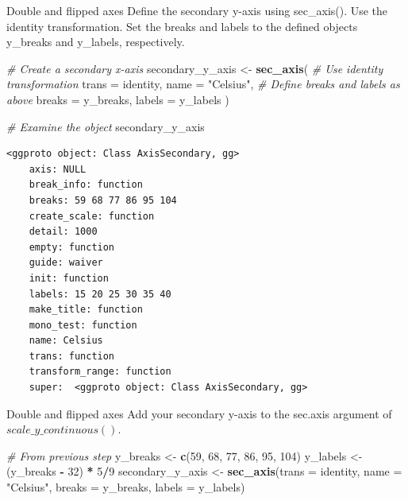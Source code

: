 \documentclass[
  ignorenonframetext,
]{beamer}
\newenvironment{Shaded}{\begin{snugshade}}{\end{snugshade}}
\newcommand{\AttributeTok}[1]{\textcolor[rgb]{0.13,0.29,0.53}{#1}}
\newcommand{\CommentTok}[1]{\textcolor[rgb]{0.56,0.35,0.01}{\textit{#1}}}
\newcommand{\DecValTok}[1]{\textcolor[rgb]{0.00,0.00,0.81}{#1}}
\newcommand{\FunctionTok}[1]{\textcolor[rgb]{0.13,0.29,0.53}{\textbf{#1}}}
\newcommand{\NormalTok}[1]{#1}
\newcommand{\OtherTok}[1]{\textcolor[rgb]{0.56,0.35,0.01}{#1}}
\newcommand{\SpecialCharTok}[1]{\textcolor[rgb]{0.81,0.36,0.00}{\textbf{#1}}}
\newcommand{\StringTok}[1]{\textcolor[rgb]{0.31,0.60,0.02}{#1}}
\begin{document}
\begin{frame}[fragile]{Double and flipped axes}
\label{double-and-flipped-axes-6}
Define the secondary y-axis using sec\_axis(). Use the identity
transformation. Set the breaks and labels to the defined objects
y\_breaks and y\_labels, respectively.


\begin{Shaded}
\begin{Highlighting}[]
\CommentTok{\# Create a secondary x{-}axis}
\NormalTok{secondary\_y\_axis }\OtherTok{\textless{}{-}} \FunctionTok{sec\_axis}\NormalTok{(}
  \CommentTok{\# Use identity transformation}
  \AttributeTok{trans =}\NormalTok{ identity,}
  \AttributeTok{name =} \StringTok{"Celsius"}\NormalTok{,}
  \CommentTok{\# Define breaks and labels as above}
  \AttributeTok{breaks =}\NormalTok{ y\_breaks,}
  \AttributeTok{labels =}\NormalTok{ y\_labels}
\NormalTok{)}

\CommentTok{\# Examine the object}
\NormalTok{secondary\_y\_axis}
\end{Highlighting}
\end{Shaded}

\begin{verbatim}
<ggproto object: Class AxisSecondary, gg>
    axis: NULL
    break_info: function
    breaks: 59 68 77 86 95 104
    create_scale: function
    detail: 1000
    empty: function
    guide: waiver
    init: function
    labels: 15 20 25 30 35 40
    make_title: function
    mono_test: function
    name: Celsius
    trans: function
    transform_range: function
    super:  <ggproto object: Class AxisSecondary, gg>
\end{verbatim}
\end{frame}

\begin{frame}[fragile]{Double and flipped axes}
\label{double-and-flipped-axes-7}
Add your secondary y-axis to the sec.axis argument of
\(scale\_y\_continuous()\).


\begin{Shaded}
\begin{Highlighting}[]
\CommentTok{\# From previous step}
\NormalTok{y\_breaks }\OtherTok{\textless{}{-}} \FunctionTok{c}\NormalTok{(}\DecValTok{59}\NormalTok{, }\DecValTok{68}\NormalTok{, }\DecValTok{77}\NormalTok{, }\DecValTok{86}\NormalTok{, }\DecValTok{95}\NormalTok{, }\DecValTok{104}\NormalTok{)}
\NormalTok{y\_labels }\OtherTok{\textless{}{-}}\NormalTok{ (y\_breaks }\SpecialCharTok{{-}} \DecValTok{32}\NormalTok{) }\SpecialCharTok{*} \DecValTok{5}\SpecialCharTok{/}\DecValTok{9}
\NormalTok{secondary\_y\_axis }\OtherTok{\textless{}{-}} \FunctionTok{sec\_axis}\NormalTok{(}\AttributeTok{trans =}\NormalTok{ identity, }\AttributeTok{name =} \StringTok{"Celsius"}\NormalTok{,}
    \AttributeTok{breaks =}\NormalTok{ y\_breaks, }\AttributeTok{labels =}\NormalTok{ y\_labels)}
\end{Highlighting}
\end{Shaded}
\end{frame}
\end{document}
